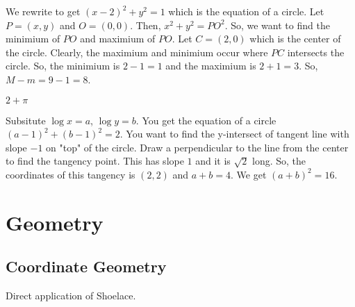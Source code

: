\documentclass[11pt]{article}
\begin{document}
\begin{sol}
We rewrite to get $(x-2)^2+y^2=1$ which is the equation of a circle. Let $P=(x,y)$ and $O=(0,0)$. Then, $x^2+y^2=PO^2$. So, we want to find the minimium of $PO$ and maximium of $PO$. Let $C=(2,0)$ which is the center of the circle. Clearly, the maximium and minimium occur where $PC$ intersects the circle. So, the minimium is $2-1=1$ and the maximium is $2+1=3$. So, $M-m=9-1=\boxed{8}$.
\end{sol}


\begin{sol}
$\boxed{2+\pi}$
\end{sol}

\begin{sol} 
Subsitute $\log x =a$, $\log y = b$. You get the equation of a circle $(a-1)^2+(b-1)^2=2$. You want to find the y-intersect of tangent line with slope $-1$ on "top" of the circle. Draw a perpendicular to the line from the center to find the tangency point. This has slope $1$ and it is $\sqrt{2}$ long. So, the coordinates of this tangency is $(2,2)$ and $a+b=4$. We get $(a+b)^2=\boxed{16}$.
\end{sol}


\setcounter{problem}{0}
\section{Geometry}

\subsection{Coordinate Geometry}


\begin{sol} 
Direct application of Shoelace.
\end{sol}
\end{document}
